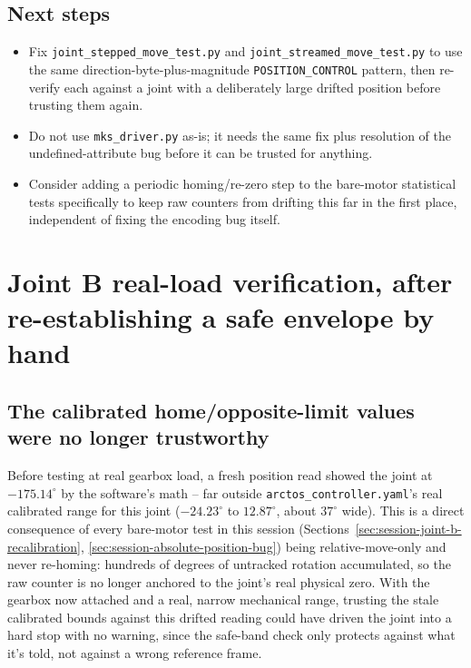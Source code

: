 \documentclass[11pt,letterpaper]{article}
\begin{document}
\subsection{Next steps}
\begin{itemize}
    \item Fix \texttt{joint\_stepped\_move\_test.py} and \texttt{joint\_streamed\_move\_test.py} to use the same direction-byte-plus-magnitude \texttt{POSITION\_CONTROL} pattern, then re-verify each against a joint with a deliberately large drifted position before trusting them again.
    \item Do not use \texttt{mks\_driver.py} as-is; it needs the same fix plus resolution of the undefined-attribute bug before it can be trusted for anything.
    \item Consider adding a periodic homing/re-zero step to the bare-motor statistical tests specifically to keep raw counters from drifting this far in the first place, independent of fixing the encoding bug itself.
\end{itemize}

\section{Joint B real-load verification, after re-establishing a safe envelope by hand}
\label{sec:session-joint-b-real-load}

\subsection{The calibrated home/opposite-limit values were no longer trustworthy}
Before testing at real gearbox load, a fresh position read showed the joint at $-175.14^\circ$ by the software's math -- far outside \texttt{arctos\_controller.yaml}'s real calibrated range for this joint ($-24.23^\circ$ to $12.87^\circ$, about $37^\circ$ wide). This is a direct consequence of every bare-motor test in this session (Sections~\ref{sec:session-joint-b-recalibration}, \ref{sec:session-absolute-position-bug}) being relative-move-only and never re-homing: hundreds of degrees of untracked rotation accumulated, so the raw counter is no longer anchored to the joint's real physical zero. With the gearbox now attached and a real, narrow mechanical range, trusting the stale calibrated bounds against this drifted reading could have driven the joint into a hard stop with no warning, since the safe-band check only protects against what it's told, not against a wrong reference frame.
\end{document}
